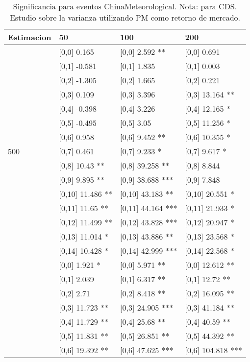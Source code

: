 \begin{table}

\caption{Significancia para eventos ChinaMeteorological. Nota: para CDS. Estudio sobre la varianza utilizando PM como retorno de mercado.}
\centering
\begin{tabular}[t]{llll}
\toprule
Estimacion & 50 & 100 & 200\\
\midrule
 & {}[0,0] 0.165 & {}[0,0] 2.592 ** & {}[0,0] 0.691\\
 & {}[0,1] -0.581 & {}[0,1] 1.835 & {}[0,1] 0.003\\
 & {}[0,2] -1.305 & {}[0,2] 1.665 & {}[0,2] 0.221\\
 & {}[0,3] 0.109 & {}[0,3] 3.396 & {}[0,3] 13.164 **\\
 & {}[0,4] -0.398 & {}[0,4] 3.226 & {}[0,4] 12.165 *\\
\addlinespace
 & {}[0,5] -0.495 & {}[0,5] 3.05 & {}[0,5] 11.256 *\\
 & {}[0,6] 0.958 & {}[0,6] 9.452 ** & {}[0,6] 10.355 *\\
500 & {}[0,7] 0.461 & {}[0,7] 9.233 * & {}[0,7] 9.617 *\\
 & {}[0,8] 10.43 ** & {}[0,8] 39.258 ** & {}[0,8] 8.844\\
 & {}[0,9] 9.895 ** & {}[0,9] 38.688 *** & {}[0,9] 7.848\\
\addlinespace
 & {}[0,10] 11.486 ** & {}[0,10] 43.183 ** & {}[0,10] 20.551 *\\
 & {}[0,11] 11.65 ** & {}[0,11] 44.164 *** & {}[0,11] 21.933 *\\
 & {}[0,12] 11.499 ** & {}[0,12] 43.828 *** & {}[0,12] 20.947 *\\
 & {}[0,13] 11.014 * & {}[0,13] 43.886 ** & {}[0,13] 23.568 *\\
 & {}[0,14] 10.428 * & {}[0,14] 42.999 *** & {}[0,14] 22.568 *\\
\addlinespace
 & {}[0,0] 1.921 * & {}[0,0] 5.971 ** & {}[0,0] 12.612 **\\
 & {}[0,1] 2.039 & {}[0,1] 6.317 ** & {}[0,1] 12.72 **\\
 & {}[0,2] 2.71 & {}[0,2] 8.418 ** & {}[0,2] 16.095 **\\
 & {}[0,3] 11.723 ** & {}[0,3] 24.905 *** & {}[0,3] 41.184 **\\
 & {}[0,4] 11.729 ** & {}[0,4] 25.68 ** & {}[0,4] 40.59 **\\
\addlinespace
 & {}[0,5] 11.831 ** & {}[0,5] 26.851 ** & {}[0,5] 44.392 **\\
 & {}[0,6] 19.392 ** & {}[0,6] 47.625 *** & {}[0,6] 104.818 ***\\

\end{tabular}
\end{table}
